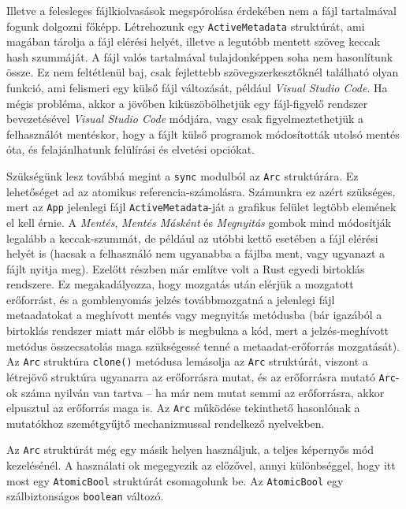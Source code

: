 \label{active_metadata}
Illetve a felesleges fájlkiolvasások megspórolása érdekében nem a fájl tartalmával fogunk dolgozni főképp.
Létrehozunk egy \texttt{ActiveMetadata} struktúrát, ami magában tárolja a fájl elérési helyét,
illetve a legutóbb mentett szöveg keccak hash szummáját.
A fájl valós tartalmával tulajdonképpen soha nem hasonlítunk össze.
Ez nem feltétlenül baj, csak fejlettebb szövegszerkesztőknél található olyan funkció, ami felismeri
egy külső fájl változását, például \textit{Visual Studio Code}.
Ha mégis probléma, akkor a jövőben kiküszöbölhetjük egy fájl-figyelő rendszer bevezetésével \textit{Visual Studio Code} módjára,
vagy csak figyelmeztethetjük a felhasználót mentéskor, hogy a fájlt külső programok módosították utolsó mentés óta,
és felajánlhatunk felülírási és elvetési opciókat.

Szükségünk lesz továbbá megint a \texttt{sync} modulból az \texttt{Arc} struktúrára.
Ez lehetőséget ad az atomikus referencia-számolásra.
Számunkra ez azért szükséges, mert az \texttt{App} jelenlegi fájl \texttt{ActiveMetadata}-ját
a grafikus felület legtöbb elemének el kell érnie.
A \textit{Mentés}, \textit{Mentés Másként} és \textit{Megnyitás} gombok mind módosítják legalább a keccak-szummát,
de például az utóbbi kettő esetében a fájl elérési helyét is (hacsak a felhasználó nem ugyanabba a fájlba ment,
vagy ugyanazt a fájlt nyitja meg).
Ezelőtt  részben már említve volt a Rust egyedi birtoklás rendszere.
Ez megakadályozza, hogy mozgatás után elérjük a mozgatott erőforrást, és a gomblenyomás jelzés
továbbmozgatná a jelenlegi fájl metaadatokat a meghívott mentés vagy megnyitás metódusba
(bár igazából a birtoklás rendszer miatt már előbb is megbukna a kód, mert a jelzés-meghívott metódus
összecsatolás maga szükségessé tenné a metaadat-erőforrás mozgatását).
Az \texttt{Arc} struktúra \texttt{clone()} metódusa lemásolja az \texttt{Arc} struktúrát,
viszont a létrejövő struktúra ugyanarra az erőforrásra mutat, és az erőforrásra mutató \texttt{Arc}-ok
száma nyilván van tartva -- ha már nem mutat semmi az erőforrásra, akkor elpusztul az erőforrás maga is.
Az \texttt{Arc} működése tekinthető hasonlónak a mutatókhoz szemétgyűjtő mechanizmussal rendelkező nyelvekben.

Az \texttt{Arc} struktúrát még egy másik helyen használjuk, a teljes képernyős mód kezelésénél.
A használati ok megegyezik az előzővel, annyi különbséggel, hogy itt most egy \texttt{AtomicBool} struktúrát csomagolunk be.
Az \texttt{AtomicBool} egy szálbiztonságos \texttt{boolean} változó.

